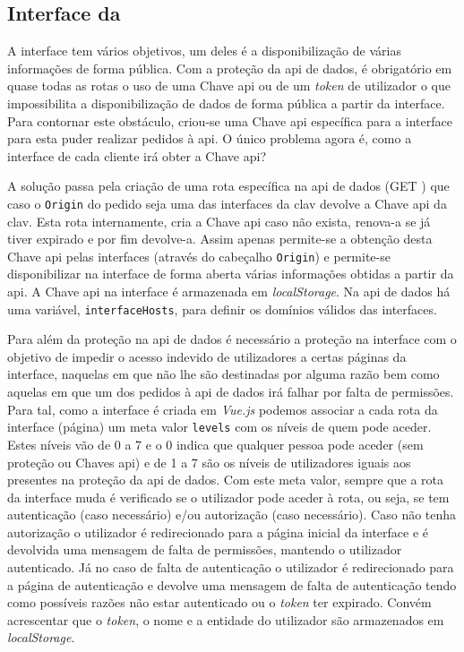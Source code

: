 \subsection{Interface da }

A interface tem vários objetivos, um deles é a disponibilização de várias informações de forma pública. Com a proteção da \acrshort{api} de dados, é obrigatório em quase todas as rotas o uso de uma Chave \acrshort{api} ou de um \textit{token} de utilizador o que impossibilita a disponibilização de dados de forma pública a partir da interface. Para contornar este obstáculo, criou-se uma Chave \acrshort{api} específica para a interface para esta puder realizar pedidos à \acrshort{api}. O único problema agora é, como a interface de cada cliente irá obter a Chave \acrshort{api}?

A solução passa pela criação de uma rota específica na \acrshort{api} de dados (GET ) que caso o \texttt{Origin} do pedido seja uma das interfaces da \acrshort{clav} devolve a Chave \acrshort{api} da \acrshort{clav}. Esta rota internamente, cria a Chave \acrshort{api} caso não exista, renova-a se já tiver expirado e por fim devolve-a. Assim apenas permite-se a obtenção desta Chave \acrshort{api} pelas interfaces (através do cabeçalho \texttt{Origin}) e permite-se disponibilizar na interface de forma aberta várias informações obtidas a partir da \acrshort{api}. A Chave \acrshort{api} na interface é armazenada em \textit{localStorage}. Na \acrshort{api} de dados há uma variável, \texttt{interfaceHosts}, para definir os domínios válidos das interfaces.

Para além da proteção na \acrshort{api} de dados é necessário a proteção na interface com o objetivo de impedir o acesso indevido de utilizadores a certas páginas da interface, naquelas em que não lhe são destinadas por alguma razão bem como aquelas em que um dos pedidos à \acrshort{api} de dados irá falhar por falta de permissões. Para tal, como a interface é criada em \textit{Vue.js} podemos associar a cada rota da interface (página) um meta valor \texttt{levels} com os níveis de quem pode aceder. Estes níveis vão de 0 a 7 e o 0 indica que qualquer pessoa pode aceder (sem proteção ou Chaves \acrshort{api}) e de 1 a 7 são os níveis de utilizadores iguais aos presentes na proteção da \acrshort{api} de dados. Com este meta valor, sempre que a rota da interface muda é verificado se o utilizador pode aceder à rota, ou seja, se tem autenticação (caso necessário) e/ou autorização (caso necessário). Caso não tenha autorização o utilizador é redirecionado para a página inicial da interface e é devolvida uma mensagem de falta de permissões, mantendo o utilizador autenticado. Já no caso de falta de autenticação o utilizador é redirecionado para a página de autenticação e devolve uma mensagem de falta de autenticação tendo como possíveis razões não estar autenticado ou o \textit{token} ter expirado. Convém acrescentar que o \textit{token}, o nome e a entidade do utilizador são armazenados em \textit{localStorage}.

